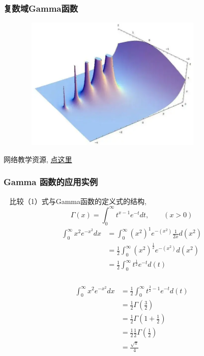 \begin{frame}
	\frametitle{复数域Gamma函数}
  \begin{center}
	   \includegraphics[width=0.85\textwidth,height=2.5in]{figs/2022-03-26-17-20-10.png}
  \end{center}
  网络教学资源, \href{https://www.bilibili.com/video/av892512155/}{点这里}
\end{frame}

\begin{frame}
	\frametitle{Gamma 函数的应用实例}
	\解 ~ 比较（1）式与Gamma函数的定义式的结构,
	\[\Gamma(x)=\int_{0}^{\infty} t^{x-1} e^{-t} dt, \qquad (x>0)\]
	\[\begin{aligned}
		\int_{0}^{\infty} x^2 e^{-x^2} dx &= \int_{0}^{\infty} (x^2)^1 e^{-(x^2)} \frac{1}{2x}d(x^2)\\
		&= \frac{1}{2}\int_{0}^{\infty} (x^2)^{\frac{1}{2}} e^{-(x^2)} d(x^2)\\	
		&= \frac{1}{2}\int_{0}^{\infty} t^{\frac{1}{2}} e^{-t} d(t)
	\end{aligned} \]
\end{frame}

\begin{frame}
	  \frametitle{}
	  \[\begin{aligned}
		\int_{0}^{\infty} x^2 e^{-x^2} dx &= \frac{1}{2}\int_{0}^{\infty} t^{\frac{3}{2}-1} e^{-t} d(t)\\	
		&= \frac{1}{2}\Gamma(\frac{3}{2})  \\ 
		&= \frac{1}{2}\Gamma(1+\frac{1}{2})  \\ 
		&= \frac{1}{2} \frac{1}{2} \Gamma(\frac{1}{2})  \\ 
		&= \frac{\sqrt{\pi}}{4} 
	\end{aligned} \]
\end{frame}

